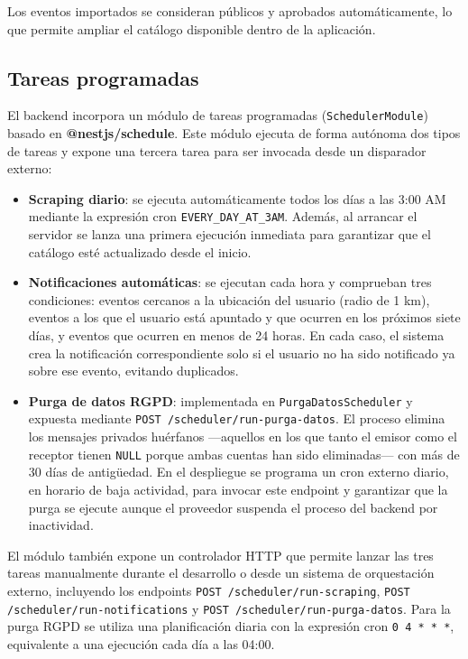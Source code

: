 Los eventos importados se consideran públicos y aprobados automáticamente, lo que permite ampliar el catálogo disponible dentro de la aplicación.

\subsection{Tareas programadas}\label{sec:scheduler}

El backend incorpora un módulo de tareas programadas (\texttt{SchedulerModule}) basado en \textbf{@nestjs/schedule}. Este módulo ejecuta de forma autónoma dos tipos de tareas y expone una tercera tarea para ser invocada desde un disparador externo:

\begin{itemize}
    \item \textbf{Scraping diario}: se ejecuta automáticamente todos los días a las 3:00 AM mediante la expresión cron \texttt{EVERY\_DAY\_AT\_3AM}. Además, al arrancar el servidor se lanza una primera ejecución inmediata para garantizar que el catálogo esté actualizado desde el inicio.
    \item \textbf{Notificaciones automáticas}: se ejecutan cada hora y comprueban tres condiciones: eventos cercanos a la ubicación del usuario (radio de 1 km), eventos a los que el usuario está apuntado y que ocurren en los próximos siete días, y eventos que ocurren en menos de 24 horas. En cada caso, el sistema crea la notificación correspondiente solo si el usuario no ha sido notificado ya sobre ese evento, evitando duplicados.
    \item \textbf{Purga de datos RGPD}: implementada en \texttt{PurgaDatosScheduler} y expuesta mediante \texttt{POST /scheduler/run-purga-datos}. El proceso elimina los mensajes privados huérfanos —aquellos en los que tanto el emisor como el receptor tienen \texttt{NULL} porque ambas cuentas han sido eliminadas— con más de 30 días de antigüedad. En el despliegue se programa un cron externo diario, en horario de baja actividad, para invocar este endpoint y garantizar que la purga se ejecute aunque el proveedor suspenda el proceso del backend por inactividad.
\end{itemize}

El módulo también expone un controlador HTTP que permite lanzar las tres tareas manualmente durante el desarrollo o desde un sistema de orquestación externo, incluyendo los endpoints \texttt{POST /scheduler/run-scraping}, \texttt{POST /scheduler/run-notifications} y \texttt{POST /scheduler/run-purga-datos}. Para la purga RGPD se utiliza una planificación diaria con la expresión cron \texttt{0 4 * * *}, equivalente a una ejecución cada día a las 04:00.

